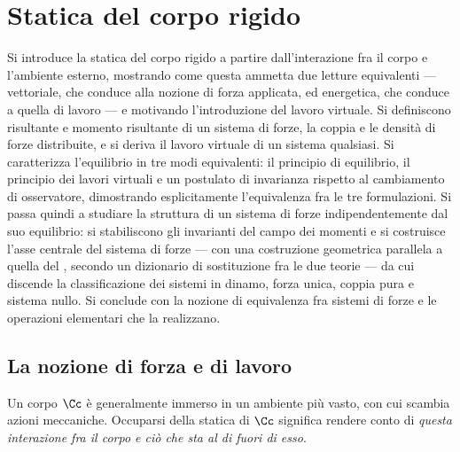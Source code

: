 \graphicspath{{Parti/P03-Meccanica_SR/C02-Statica_CR/Figure/}}
\chapter{Statica del corpo rigido}\label{cap:statica_CR}


\begin{sommario}
	Si introduce la statica del corpo rigido a partire dall'interazione
	fra il corpo e l'ambiente esterno, mostrando come questa ammetta due
	letture equivalenti --- vettoriale, che conduce alla nozione di forza
	applicata, ed energetica, che conduce a quella di lavoro --- e
	motivando l'introduzione del lavoro virtuale. Si definiscono
	risultante e momento risultante di un sistema di forze, la coppia  e le densità di forze distribuite, e si deriva il lavoro
	virtuale di un sistema qualsiasi. Si caratterizza l'equilibrio in tre
	modi equivalenti: il principio di equilibrio, il principio dei lavori
	virtuali e un postulato di invarianza rispetto al cambiamento di
	osservatore, dimostrando esplicitamente l'equivalenza fra le tre
	formulazioni. Si passa quindi a studiare la struttura di un sistema di
	forze indipendentemente dal suo equilibrio: si stabiliscono gli
	invarianti del campo dei momenti e si costruisce l'asse centrale del
	sistema di forze --- con una costruzione geometrica parallela a quella
	del , secondo un dizionario di
	sostituzione fra le due teorie --- da cui discende la classificazione
	dei sistemi in dinamo, forza unica, coppia pura e sistema nullo. Si
	conclude con la nozione di equivalenza fra sistemi di forze e le
	operazioni elementari che la realizzano.
\end{sommario}

\section{La nozione di forza e di lavoro}\label{sec:forza_lavoro}

Un corpo $\Cc$  è generalmente immerso in un ambiente più vasto, con cui scambia
azioni meccaniche. Occuparsi della statica di $\Cc$ significa rendere conto di \emph{questa
	interazione fra il corpo e ciò che sta al di fuori di esso}. 

